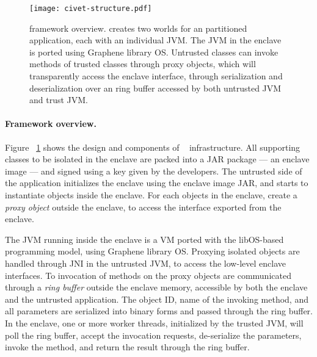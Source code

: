 \begin{figure}[t!]
\vspace{-0.1in}
\centering
\texttt{[image: civet-structure.pdf]}
\vspace{-10pt}
\caption{\sysname{} framework overview. \sysname{} creates two worlds for an partitioned \java{} application, each with an individual JVM. The JVM in the enclave is ported using Graphene library OS. Untrusted classes can invoke methods of trusted classes through proxy objects, which will transparently access the enclave interface, through serialization and deserialization over an ring buffer accessed by both untrusted JVM and trust JVM. }
\label{fig:overview}
\end{figure}

\paragraph{Framework overview.} Figure ~\ref{fig:overview} shows the design and 
components of ~\sysname{} infrastructure.
All supporting classes to be isolated in the enclave
are packed into a JAR package --- an enclave image ---
and signed using a key given by the developers.
The untrusted side of the application initializes the enclave
using the enclave image JAR,
and starts to instantiate objects inside the enclave.
For each objects in the enclave, \sysname{} create a {\em proxy object} outside the enclave,
to access the interface exported from the enclave.

The JVM running inside the enclave is a \jvmname{} VM
ported with the libOS-based programming model, using Graphene library OS.
Proxying isolated objects are handled through JNI in the untrusted JVM,
to access the low-level enclave interfaces.
To invocation of methods on the proxy objects are communicated
through a {\em ring buffer} outside the enclave memory,
accessible by both the enclave and the untrusted application.
The object ID, name of the invoking method, and all parameters are
serialized into binary forms and passed through the ring buffer.
In the enclave, one or more worker threads, initialized by the trusted JVM,
will poll the ring buffer,
accept the invocation requests,
de-serialize the parameters, invoke the method,
and return the result through the ring buffer.

